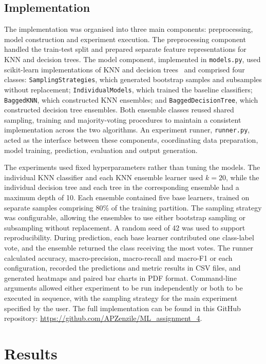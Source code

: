 \documentclass[conference, 10pt]{IEEEtran}
\begin{document}
\subsection{Implementation}

The implementation was organised into three main components: preprocessing, model construction and experiment execution. 
The preprocessing component handled the train-test split and prepared separate feature representations for KNN and decision 
trees. The model component, implemented in \texttt{models.py}, used scikit-learn implementations of KNN and decision 
trees~\cite{pedregosa2011scikit} and comprised four classes: \texttt{SamplingStrategies}, which generated bootstrap samples 
and subsamples without replacement; \texttt{IndividualModels}, which trained the baseline classifiers; \texttt{BaggedKNN}, 
which constructed KNN ensembles; and \texttt{BaggedDecisionTree}, which constructed decision tree ensembles. Both ensemble 
classes reused shared sampling, training and majority-voting procedures to maintain a consistent implementation across the 
two algorithms. An experiment runner, \texttt{runner.py}, acted as the interface between these components, coordinating data 
preparation, model training, prediction, evaluation and output generation.

The experiments used fixed hyperparameters rather than tuning the models. The individual KNN classifier and each KNN ensemble 
learner used \(k=20\), while the individual decision tree and each tree in the corresponding ensemble had a maximum depth of 10. 
Each ensemble contained five base learners, trained on separate samples comprising 80\% of the training partition. The sampling 
strategy was configurable, allowing the ensembles to use either bootstrap sampling or subsampling without replacement. A random 
seed of 42 was used to support reproducibility. During prediction, each base learner contributed one class-label vote, and the 
ensemble returned the class receiving the most votes. The runner calculated accuracy, macro-precision, macro-recall and macro-F1 
or each configuration, recorded the predictions and metric results in CSV files, and generated heatmaps and paired bar charts in 
PDF format. Command-line arguments allowed either experiment to be run independently or both to be executed in sequence, with the 
sampling strategy for the main experiment specified by the user. The full implementation can be found in this GitHub 
repository: \url{https://github.com/APZenzile/ML_assignment_4}.

\section{Results}
\end{document}
